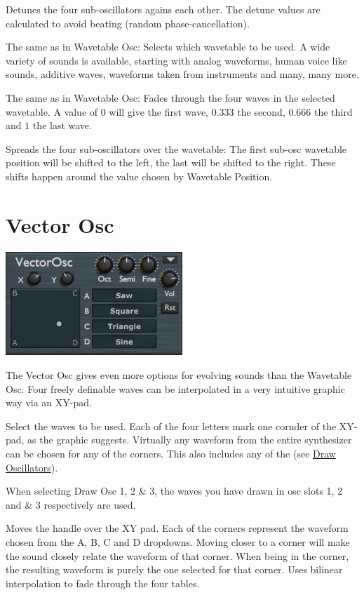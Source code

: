 Detunes the four sub-oscillators agains each other. The detune values are calculated to avoid beating (random phase-cancellation).

The same as in Wavetable Osc: Selects which wavetable to be used. A wide variety of sounds is available, starting with analog waveforms, human voice like sounds, additive waves, waveforms taken from instruments and many, many more.

The same as in Wavetable Osc: Fades through the four waves in the selected wavetable. A value of $0$ will give the first wave, $0.333$ the second, $0.666$ the third and $1$ the last wave.

Spreads the four sub-oscillators over the wavetable: The first sub-osc wavetable position will be shifted to the left, the last will be shifted to the right. These shifts happen around the value chosen by Wavetable Position.

\section{Vector Osc}
\begin{center}
    \includegraphics[width=0.5\textwidth]{graphics/vector_osc.png}
\end{center}
The Vector Osc gives even more options for evolving sounds than the Wavetable Osc. Four freely definable waves can be interpolated in a very intuitive graphic way via an XY-pad.

Select the waves to be used. Each of the four letters mark one cornder of the XY-pad, as the graphic suggests. Virtually any waveform from the entire synthesizer can be chosen for any of the corners. This also includes any of the (see \hyperref[wavedraw]{Draw Oscillators}).

When selecting  Draw Osc 1, 2 \& 3, the waves you have drawn in osc slots 1, 2 and \& 3 respectively are used.

Moves the handle over the XY pad. Each of the corners represent the waveform chosen from the A, B, C and D dropdowns. Moving closer to a corner will make the sound closely relate the waveform of that corner. When being in the corner, the resulting waveform is purely the one selected for that corner. Uses bilinear interpolation to fade through the four tables.

